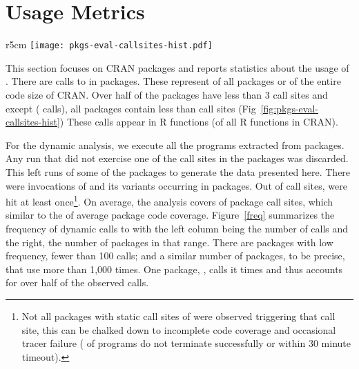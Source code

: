 \documentclass[screen,acmsmall]{acmart}
\begin{document}
\newpage

\section{Usage Metrics}

\begin{wrapfigure}{r}{5cm} \hspace*{-12mm}
  \texttt{[image: pkgs-eval-callsites-hist.pdf]} \caption{CRAN
  \eval call sites}%
  \label{fig:pkgs-eval-callsites-hist}
\end{wrapfigure}
%
This section focuses on CRAN packages and reports statistics about the usage of
\eval. There are \PkgEvalCallSites calls to \eval in \PkgPackages packages.
These represent \PkgPackagesRatio of all packages or \PkgCodeRatio of the
entire code size of CRAN. Over half of the packages have less than 3 \eval
call sites and except \MaxEvalCallSitesPackage (\MaxEvalCallSitesCount \eval
calls), all packages contain less than \MaxEvalCallSitesRest \eval call sites
(\cf Fig~\ref{fig:pkgs-eval-callsites-hist}) These \eval calls appear in
\PkgFunsWithEval R functions (\CranFunsWithEvalRatio of all R functions in
CRAN).

For the dynamic analysis, we execute all the \CranRunnableScripts programs
extracted from \CranPackages packages. Any run that did not exercise one of the
\eval call sites in the packages was discarded. This left \Nbruns runs of some
of the \Corpus packages to generate the data presented here. There were
\Allcalls invocations of \eval and its variants occurring in \Triggeredpkgs
packages. Out of \PkgEvalCallSitesRnd \eval call sites, \PkgHitEvalCallSites
were hit at least once\footnote{Not all packages with static call sites of
\eval were observed triggering that call site, this can be chalked down to
incomplete code coverage and occasional tracer failure (\PkgFailedProgramsRatio
of programs do not terminate successfully or within 30 minute timeout).}. On
average, the analysis covers \PkgHitEvalCallSitesAvgRatio of package \eval call
sites, which similar to the \PkgCodeCoverage of average package code coverage.
Figure~\ref{freq} summarizes the frequency of dynamic calls to \eval with the
left column being the number of calls and the right, the number of packages in
that range. There are \Fewcalls packages with low \eval frequency, fewer than
100 calls; and a similar number of packages, \Manycalls to be precise, that use
\eval more than 1,000 times.  One package, \Maxcallspack, calls it \Maxcalls
times and thus accounts for over half of the observed calls.
\end{document}
